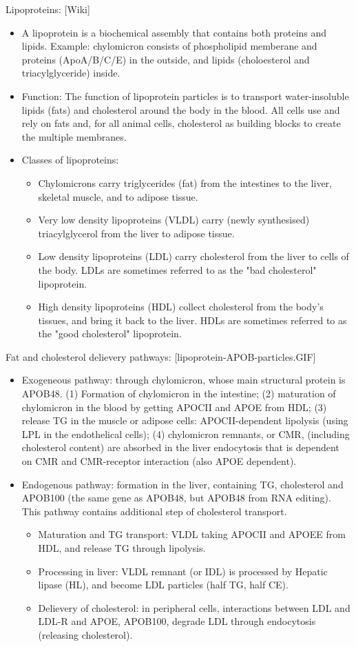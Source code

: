 \documentclass{report}
\begin{document}
\begin{enumerate}
Lipoproteins: [Wiki]
\begin{itemize}
	\item A lipoprotein is a biochemical  assembly that contains both proteins  and lipids. Example: chylomicron consists of phospholipid memberane and proteins (ApoA/B/C/E) in the outside, and lipids (choloesterol and triacylglyceride) inside. 
	\item Function: The function of lipoprotein particles is to transport water-insoluble lipids (fats) and cholesterol around the body in the blood. All cells use and rely on fats and, for all animal cells, cholesterol as building blocks to create the multiple membranes. 
	\item Classes of lipoproteins: 
	\begin{itemize}
		\item Chylomicrons carry triglycerides (fat) from the intestines  to the liver, skeletal muscle, and to adipose tissue.
		\item Very low density lipoproteins (VLDL) carry (newly synthesised) triacylglycerol from the liver to adipose tissue.
		\item Low density lipoproteins (LDL) carry cholesterol from the liver to cells of the body. LDLs are sometimes referred to as the "bad cholesterol" lipoprotein.
		\item High density lipoproteins (HDL) collect cholesterol from the body's tissues, and bring it back to the liver. HDLs are sometimes referred to as the "good cholesterol" lipoprotein.
	\end{itemize}
\end{itemize}

Fat and cholesterol delievery pathways: [lipoprotein-APOB-particles.GIF]
\begin{itemize}
\item Exogeneous pathway: through chylomicron, whose main structural protein is APOB48. (1) Formation of chylomicron in the intestine; (2) maturation of chylomicron in the blood by getting APOCII and APOE from HDL; (3) release TG in the muscle or adipose cells: APOCII-dependent lipolysis (using LPL in the endothelical cells); (4) chylomicron remnants, or CMR, (including cholesterol content) are absorbed in the liver endocytosis that is dependent on CMR and CMR-receptor interaction (also APOE dependent). 

\item Endogenous pathway: formation in the liver, containing TG, cholesterol and APOB100 (the same gene as APOB48, but APOB48 from RNA editing). This pathway contains additional step of cholesterol transport. 
\begin{itemize}
\item Maturation and TG transport: VLDL taking APOCII and APOEE from HDL, and release TG through lipolysis. 
\item Processing in liver: VLDL remnant (or IDL) is processed by Hepatic lipase (HL), and become LDL particles (half TG, half CE). 
\item Delievery of cholesterol: in peripheral cells, interactions between LDL and LDL-R and APOE, APOB100, degrade LDL through endocytosis (releasing cholesterol). 
\end{itemize}


\end{itemize}
\end{enumerate}
\end{document}

